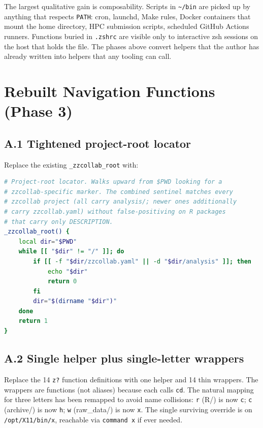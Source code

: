 \documentclass[11pt,letterpaper]{scrartcl}
\begin{document}
The largest qualitative gain is composability. Scripts in
\texttt{\textasciitilde/bin} are picked up by anything that
respects \texttt{PATH}: cron, launchd, Make rules, Docker
containers that mount the home directory, HPC submission
scripts, scheduled GitHub Actions runners. Functions buried in
\texttt{.zshrc} are visible only to interactive zsh sessions on
the host that holds the file. The phases above convert helpers
that the author has already written into helpers that any
tooling can call.

\appendix

\section{Rebuilt Navigation Functions (Phase 3)}

\subsection*{A.1 Tightened project-root locator}

Replace the existing \texttt{\_zzcollab\_root} with:

\begin{lstlisting}[language=bash]
# Project-root locator. Walks upward from $PWD looking for a
# zzcollab-specific marker. The combined sentinel matches every
# zzcollab project (all carry analysis/; newer ones additionally
# carry zzcollab.yaml) without false-positiving on R packages
# that carry only DESCRIPTION.
_zzcollab_root() {
    local dir="$PWD"
    while [[ "$dir" != "/" ]]; do
        if [[ -f "$dir/zzcollab.yaml" || -d "$dir/analysis" ]]; then
            echo "$dir"
            return 0
        fi
        dir="$(dirname "$dir")"
    done
    return 1
}
\end{lstlisting}

\subsection*{A.2 Single helper plus single-letter wrappers}

Replace the 14 \texttt{z?} function definitions with one helper
and 14 thin wrappers. The wrappers are functions (not aliases)
because each calls \texttt{cd}. The natural mapping for three
letters has been remapped to avoid name collisions: \texttt{r}
(R/) is now \texttt{c}; \texttt{c} (archive/) is now \texttt{h};
\texttt{w} (raw\_data/) is now \texttt{x}. The single surviving
override is on \texttt{/opt/X11/bin/x}, reachable via
\texttt{command x} if ever needed.
\end{document}
